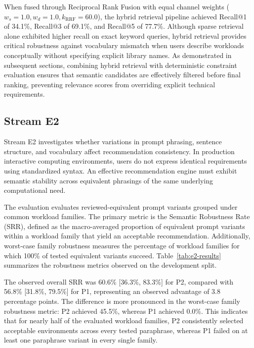 When fused through Reciprocal Rank Fusion with equal channel weights ($w_s = 1.0, w_d = 1.0, k_{\mathrm{RRF}} = 60.0$), the hybrid retrieval pipeline achieved Recall@1 of 34.1\%, Recall@3 of 69.1\%, and Recall@5 of 77.7\%. Although sparse retrieval alone exhibited higher recall on exact keyword queries, hybrid retrieval provides critical robustness against vocabulary mismatch when users describe workloads conceptually without specifying explicit library names. As demonstrated in subsequent sections, combining hybrid retrieval with deterministic constraint evaluation ensures that semantic candidates are effectively filtered before final ranking, preventing relevance scores from overriding explicit technical requirements.

\subsection{Stream E2}
\label{subsec:e2_robustness}

Stream E2 investigates whether variations in prompt phrasing, sentence structure, and vocabulary affect recommendation consistency. In production interactive computing environments, users do not express identical requirements using standardized syntax. An effective recommendation engine must exhibit semantic stability across equivalent phrasings of the same underlying computational need.

The evaluation evaluates reviewed-equivalent prompt variants grouped under common workload families. The primary metric is the Semantic Robustness Rate (SRR), defined as the macro-averaged proportion of equivalent prompt variants within a workload family that yield an acceptable recommendation. Additionally, worst-case family robustness measures the percentage of workload families for which 100\% of tested equivalent variants succeed. Table~\ref{tab:e2-results} summarizes the robustness metrics observed on the development split.



The observed overall SRR was 60.6\% [36.3\%, 83.3\%] for P2, compared with 56.8\% [31.8\%, 79.5\%] for P1, representing an observed advantage of 3.8 percentage points. The difference is more pronounced in the worst-case family robustness metric: P2 achieved 45.5\%, whereas P1 achieved 0.0\%. This indicates that for nearly half of the evaluated workload families, P2 consistently selected acceptable environments across every tested paraphrase, whereas P1 failed on at least one paraphrase variant in every single family.

